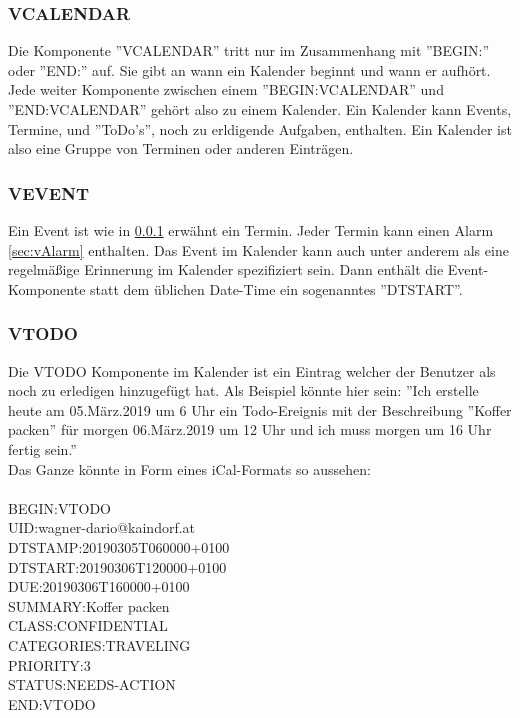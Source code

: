 \subsubsection{VCALENDAR}
\label{sec:vCalendar} 
Die Komponente ''VCALENDAR'' tritt nur im Zusammenhang mit ''BEGIN:'' oder ''END:'' auf. Sie gibt an wann ein Kalender beginnt und wann er aufhört. Jede weiter Komponente zwischen einem ''BEGIN:VCALENDAR'' und ''END:VCALENDAR'' gehört also zu einem Kalender. Ein Kalender kann Events, Termine, und ''ToDo's'', noch zu erldigende Aufgaben, enthalten. Ein Kalender ist also eine Gruppe von Terminen oder anderen Einträgen. 
\subsubsection{VEVENT}
\label{sec:vEvent} 
Ein Event ist wie in \ref{sec:vCalendar} erwähnt ein Termin. Jeder Termin kann einen Alarm \ref{sec:vAlarm} enthalten. Das Event im Kalender kann auch unter anderem als eine regelmäßige Erinnerung im Kalender spezifiziert sein. Dann enthält die Event-Komponente statt dem üblichen Date-Time ein sogenanntes ''DTSTART''.
\subsubsection{VTODO}
\label{sec:vTodo} 
Die VTODO Komponente im Kalender ist ein Eintrag welcher der Benutzer als noch zu erledigen hinzugefügt hat. Als Beispiel könnte hier sein: ''Ich erstelle heute am 05.März.2019 um 6 Uhr ein Todo-Ereignis mit der Beschreibung ''Koffer packen'' für morgen 06.März.2019 um 12 Uhr und ich muss morgen um 16 Uhr fertig sein.'' \\
Das Ganze könnte in Form eines iCal-Formats so aussehen: \\ \\
  BEGIN:VTODO \\
  UID:wagner-dario@kaindorf.at\\
  DTSTAMP:20190305T060000+0100\\
  DTSTART:20190306T120000+0100\\
  DUE:20190306T160000+0100\\
  SUMMARY:Koffer packen\\
  CLASS:CONFIDENTIAL\\
  CATEGORIES:TRAVELING\\
  PRIORITY:3\\
  STATUS:NEEDS-ACTION\\
  END:VTODO\\
  
